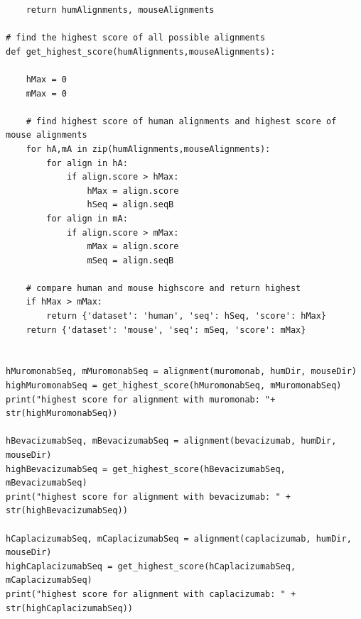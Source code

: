 \documentclass[11pt]{article}
\begin{document}
\begin{verbatim}
    return humAlignments, mouseAlignments

# find the highest score of all possible alignments
def get_highest_score(humAlignments,mouseAlignments):

    hMax = 0
    mMax = 0
      
    # find highest score of human alignments and highest score of mouse alignments
    for hA,mA in zip(humAlignments,mouseAlignments):
        for align in hA:
            if align.score > hMax: 
                hMax = align.score
                hSeq = align.seqB
        for align in mA:
            if align.score > mMax:
                mMax = align.score
                mSeq = align.seqB
    
    # compare human and mouse highscore and return highest
    if hMax > mMax:
        return {'dataset': 'human', 'seq': hSeq, 'score': hMax}
    return {'dataset': 'mouse', 'seq': mSeq, 'score': mMax}        


hMuromonabSeq, mMuromonabSeq = alignment(muromonab, humDir, mouseDir)
highMuromonabSeq = get_highest_score(hMuromonabSeq, mMuromonabSeq)
print("highest score for alignment with muromonab: "+ str(highMuromonabSeq))

hBevacizumabSeq, mBevacizumabSeq = alignment(bevacizumab, humDir, mouseDir)
highBevacizumabSeq = get_highest_score(hBevacizumabSeq, mBevacizumabSeq)
print("highest score for alignment with bevacizumab: " + str(highBevacizumabSeq))

hCaplacizumabSeq, mCaplacizumabSeq = alignment(caplacizumab, humDir, mouseDir)
highCaplacizumabSeq = get_highest_score(hCaplacizumabSeq, mCaplacizumabSeq)
print("highest score for alignment with caplacizumab: " + str(highCaplacizumabSeq))

\end{verbatim}


\clearpage


\printbibliography
\end{document}

